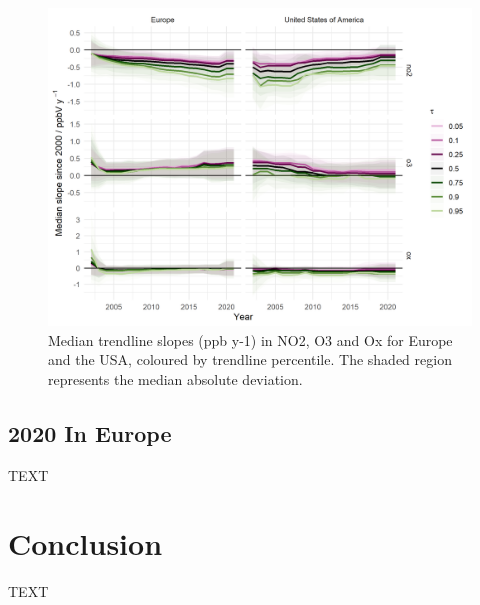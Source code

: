 \documentclass[journal abbreviation, manuscript]{copernicus}
\begin{document}
\begin{figure}[t]
\includegraphics[width=12cm]{plots/fixed_median_slopes_per_tau_continent_name.png}
\caption{Median trendline slopes (ppb y-1) in NO2, O3 and Ox for Europe and the USA, coloured by trendline percentile. The shaded region represents the median absolute deviation.}
\label{median_slopes_per_tau_cont_name_trends}
\end{figure}

\clearpage

\subsection{2020 In Europe}
TEXT

\section{Conclusion}  %
TEXT








\end{document}
